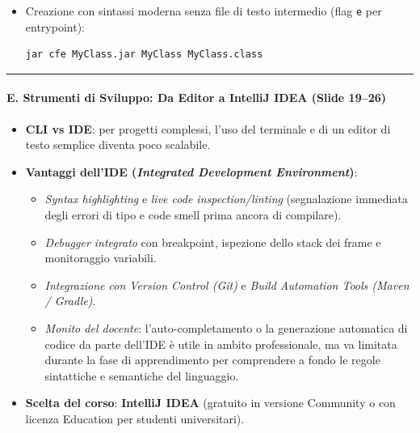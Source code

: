 \documentclass[11pt,a4paper]{article}
\newcommand{\passthrough}[1]{#1}
\providecommand{\tightlist}{\setlength{\itemsep}{0pt}\setlength{\parskip}{0pt}}
\begin{document}
\begin{itemize}
\begin{itemize}
\begin{lstlisting}[language=bash]
jar cvfm MyClass.jar manifest.txt MyClass.class
\end{lstlisting}
  \item
    Creazione con sintassi moderna senza file di testo intermedio (flag
    \passthrough{\lstinline!e!} per entrypoint):

\begin{lstlisting}[language=bash]
jar cfe MyClass.jar MyClass MyClass.class
\end{lstlisting}
  \end{itemize}
\end{itemize}

\begin{center}\rule{0.5\linewidth}{0.5pt}\end{center}

\paragraph{E. Strumenti di Sviluppo: Da Editor a IntelliJ IDEA (Slide
19--26)}\label{e.-strumenti-di-sviluppo-da-editor-a-intellij-idea-slide-1926}

\begin{itemize}
\tightlist
\item
  \textbf{CLI vs IDE}: per progetti complessi, l'uso del terminale e di
  un editor di testo semplice diventa poco scalabile.
\item
  \textbf{Vantaggi dell'IDE (\emph{Integrated Development
  Environment})}:

  \begin{itemize}
  \tightlist
  \item
    \emph{Syntax highlighting} e \emph{live code inspection/linting}
    (segnalazione immediata degli errori di tipo e code smell prima
    ancora di compilare).
  \item
    \emph{Debugger integrato} con breakpoint, ispezione dello stack dei
    frame e monitoraggio variabili.
  \item
    \emph{Integrazione con Version Control (Git)} e \emph{Build
    Automation Tools (Maven / Gradle)}.
  \item
    \emph{Monito del docente}: l'auto-completamento o la generazione
    automatica di codice da parte dell'IDE è utile in ambito
    professionale, ma va limitata durante la fase di apprendimento per
    comprendere a fondo le regole sintattiche e semantiche del
    linguaggio.
  \end{itemize}
\item
  \textbf{Scelta del corso}: \textbf{IntelliJ IDEA} (gratuito in
  versione Community o con licenza Education per studenti universitari).
\end{itemize}
\end{document}
